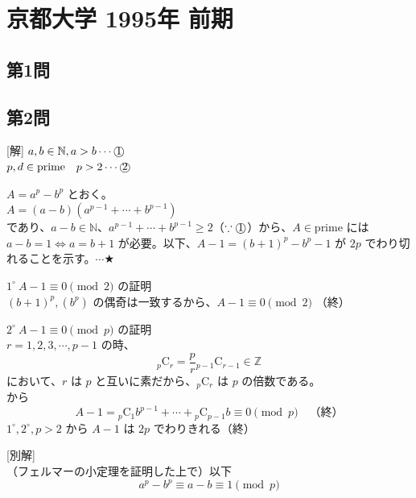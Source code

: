 \documentclass[../main.tex]{subfiles}
\begin{document}
\section*{京都大学 1995年 前期}

\subsection*{第1問}

\subsection*{第2問}
[解] $a, b \in \mathbb{N}, a > b \cdots \text{\textcircled{1}}$\\
$p, d \in \text{prime} \quad p > 2 \cdots \text{\textcircled{2}}$

$A = a^p - b^p$ とおく。\\
$A = (a - b)(a^{p-1} + \cdots + b^{p-1})$\\
であり、$a - b \in \mathbb{N}$、$a^{p-1} + \cdots + b^{p-1} \ge 2$（$\because \text{\textcircled{1}}$）から、$A \in \text{prime}$ には $a - b = 1 \iff a = b + 1$ が必要。以下、$A-1 = (b+1)^p - b^p - 1$ が $2p$ でわり切れることを示す。$\cdots \bigstar$

$1^\circ \ A - 1 \equiv 0 \pmod 2$ の証明\\
$(b+1)^p, (b^p)$ の偶奇は一致するから、$A - 1 \equiv 0 \pmod 2$ （終）

$2^\circ \ A - 1 \equiv 0 \pmod p$ の証明\\
$r = 1, 2, 3, \cdots, p-1$ の時、
\[
  {}_p\mathrm{C}_r = \frac{p}{r} {}_{p-1}\mathrm{C}_{r-1} \in \mathbb{Z}
\]
において、$r$ は $p$ と互いに素だから、${}_p\mathrm{C}_r$ は $p$ の倍数である。\\
から
\[
  A - 1 = {}_p\mathrm{C}_1 b^{p-1} + \cdots + {}_p\mathrm{C}_{p-1} b \equiv 0 \pmod p \quad \text{（終）}
\]
$1^\circ, 2^\circ, p>2$ から $A-1$ は $2p$ でわりきれる（終）

[別解]\\
（フェルマーの小定理を証明した上で）以下
\[
  a^p - b^p \equiv a - b \equiv 1 \pmod p
\]

\end{document}
